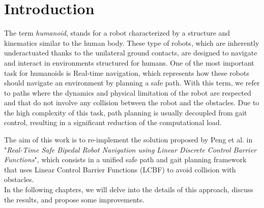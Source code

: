 \documentclass[main.tex]{subfiles}
\begin{document}
\section{Introduction}\label{sec:introduction}

The term \textit{humanoid}, stands for a robot characterized by a structure and kinematics similar to the human body. These type of robots, which are inherently underactuated thanks to the unilateral ground contacts, are designed to navigate and interact in environments structured for humans.
One of the most important task for humanoids is Real-time navigation, which represents how these robots should navigate an environment by planning a safe path. With this term, we refer to paths where the dynamics and physical limitation of the robot are respected and that do not involve any collision between the robot and the obstacles.  
Due to the high complexity of this task, path planning is usually decoupled from gait control, resulting in a significant reduction of the computational load.

The aim of this work is to re-implement the solution proposed by Peng et al. in "\textit{Real-Time Safe Bipedal Robot Navigation using Linear Discrete Control Barrier Functions}", which consists in a unified safe path and gait planning framework that uses Linear Control Barrier Functions (LCBF) to avoid collision with obstacles.\\
In the following chapters, we will delve into the details of this approach, discuss the results, and propose some improvements.
\end{document}
